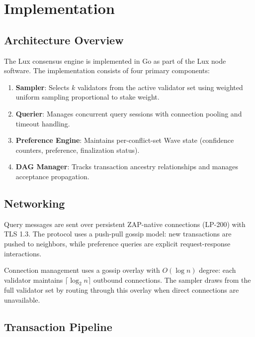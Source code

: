 \section{Implementation}

\label{sec:implementation}

\subsection{Architecture Overview}

The Lux consensus engine is implemented in Go as part of the Lux node software. The
implementation consists of four primary components:

\begin{enumerate}
\item \textbf{Sampler}: Selects $k$ validators from the active validator set using
weighted uniform sampling proportional to stake weight.
\item \textbf{Querier}: Manages concurrent query sessions with connection pooling and
timeout handling.
\item \textbf{Preference Engine}: Maintains per-conflict-set Wave state (confidence
counters, preference, finalization status).
\item \textbf{DAG Manager}: Tracks transaction ancestry relationships and manages
acceptance propagation.
\end{enumerate}

\subsection{Networking}

Query messages are sent over persistent ZAP-native connections (LP-200) with TLS 1.3.
The protocol uses a push-pull gossip model: new transactions are pushed to neighbors,
while preference queries are explicit request-response interactions.

Connection management uses a gossip overlay with $O(\log n)$ degree: each validator
maintains $\lceil \log_2 n \rceil$ outbound connections. The sampler draws from the full
validator set by routing through this overlay when direct connections are unavailable.

\subsection{Transaction Pipeline}

